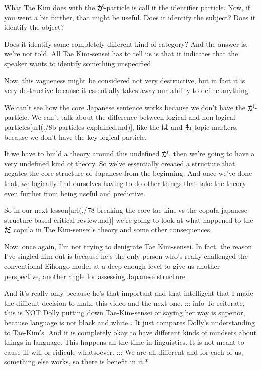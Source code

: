 What Tae Kim does with the が-particle is call it the identifier particle. Now, if you went a bit further, that might be useful. Does it identify the subject? Does it identify the object?

Does it identify some completely different kind of category? And the answer is, we're not told. All Tae Kim-sensei has to tell us is that it indicates that the speaker wants to identify something unspecified.

Now, this vagueness might be considered not very destructive, but in fact it is very destructive because it essentially takes away our ability to define anything.

{}

We can't see how the core Japanese sentence works because we don't have the が-particle. We can't talk about the difference between logical and non-logical particles\goto{{[}8b{]}}[url(./8b-particles-explained.md)], like the は and も topic markers, because we don't have the key logical particle.

If we have to build a theory around this undefined が, then we're going to have a very undefined kind of theory. So we've essentially created a structure that negates the core structure of Japanese from the beginning. And once we've done that, we logically find ourselves having to do other things that take the theory even further from being useful and predictive.

So in our next lesson\goto{{[}78{]}}[url(./78-breaking-the-core-tae-kim-vs-the-copula-japanese-structure-based-critical-review.md)] we're going to look at what happened to the だ copula in Tae Kim-sensei's theory and some other consequences.

Now, once again, I'm not trying to denigrate Tae Kim-sensei. In fact, the reason I've singled him out is because he's the only person who's really challenged the conventional Eihongo model at a deep enough level to give us another perspective, another angle for assessing Japanese structure.

And it's really only because he's that important and that intelligent that I made the difficult decision to make this video and the next one. ::: info To reiterate, this is NOT Dolly putting down Tae-Kim-sensei or saying her way is superior, because language is not black and white\ldots{} It just compares Dolly's understanding to Tae-Kim's.\crlf
And it is completely okay to have different kinds of mindsets about things in language. This happens all the time in linguistics. It is not meant to cause ill-will or ridicule whatsoever.\crlf
::: We are all different and for each of us, something else works, so there is benefit in it.*

\stopsectionlevel

\stopsectionlevel
